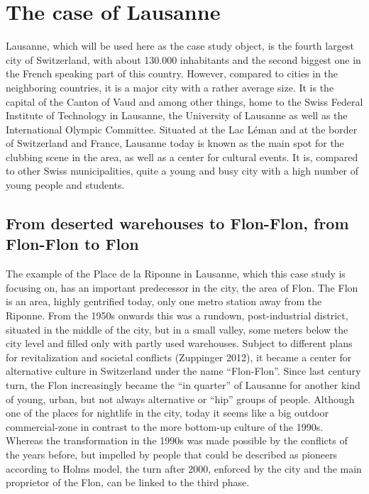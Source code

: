 \documentclass[a4paper,
fontsize=11pt,
oneside,
numbers=noperiodatend,
parskip=half-,
bibliography=totoc,
final
]{scrartcl}
\begin{document}
\section{The case of Lausanne}\label{the-case-of-lausanne}

Lausanne, which will be used here as the case study object, is the
fourth largest city of Switzerland, with about 130.000 inhabitants and
the second biggest one in the French speaking part of this country.
However, compared to cities in the neighboring countries, it is a major
city with a rather average size. It is the capital of the Canton of Vaud
and among other things, home to the Swiss Federal Institute of
Technology in Lausanne, the University of Lausanne as well as the
International Olympic Committee. Situated at the Lac Léman and at the
border of Switzerland and France, Lausanne today is known as the main
spot for the clubbing scene in the area, as well as a center for
cultural events. It is, compared to other Swiss municipalities, quite a
young and busy city with a high number of young people and students.

\subsection{From deserted warehouses to Flon-Flon, from Flon-Flon to
Flon}\label{from-deserted-warehouses-to-flon-flon-from-flon-flon-to-flon}

The example of the Place de la Riponne in Lausanne, which this case
study is focusing on, has an important predecessor in the city, the area
of Flon. The Flon is an area, highly gentrified today, only one metro
station away from the Riponne. From the 1950s onwards this was a
rundown, post-industrial district, situated in the middle of the city,
but in a small valley, some meters below the city level and filled only
with partly used warehouses. Subject to different plans for
revitalization and societal conflicts (Zuppinger 2012), it became a
center for alternative culture in Switzerland under the name
\enquote{Flon-Flon}. Since last century turn, the Flon increasingly
became the \enquote{in quarter} of Lausanne for another kind of young,
urban, but not always alternative or \enquote{hip} groups of people.
Although one of the places for nightlife in the city, today it seems
like a big outdoor commercial-zone in contrast to the more bottom-up
culture of the 1990s. Whereas the transformation in the 1990s was made
possible by the conflicts of the years before, but impelled by people
that could be described as pioneers according to Holms model, the turn
after 2000, enforced by the city and the main proprietor of the Flon,
can be linked to the third phase.
\end{document}
